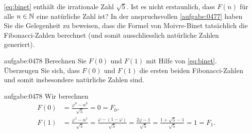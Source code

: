 \cref{eq:binet} enthält die irrationale Zahl $\sqrt{5}$. Ist es nicht erstaunlich, dass $F(n)$ für alle $n\in\mathbb{N}$ eine natürliche Zahl ist? In der anspruchsvollen \cref{aufgabe:0477} haben Sie die Gelegenheit zu beweisen, dass die Formel von Moivre-Binet tatsächlich die Fibonacci-Zahlen berechnet (und somit ausschliesslich natürliche Zahlen generiert).

\begin{aufgabe}{aufgabe:0478}
Berechnen Sie $F(0)$ und $F(1)$ mit Hilfe von \cref{eq:binet}. Überzeugen Sie sich, dass $F(0)$ und $F(1)$ die ersten beiden Fibonacci-Zahlen und somit insbesondere natürliche Zahlen sind.
\end{aufgabe}
\begin{antwort}{aufgabe:0478}
Wir berechnen
\begin{align*}
    F(0) &= \frac{\varphi^0-\alpha^0}{\sqrt{5}} = 0 = F_0, \\
    F(1) &= \frac{\varphi^1-\alpha^1}{\sqrt{5}} = \frac{\varphi-(1-\varphi)}{\sqrt{5}} = \frac{2\varphi-1}{\sqrt{5}} = \frac{1+\sqrt{5}-1}{\sqrt{5}} = 1 = F_1.
\end{align*}
\end{antwort}


